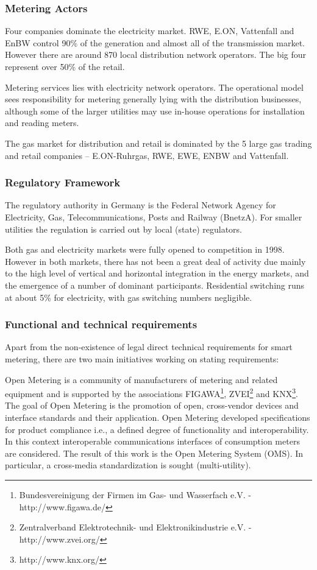 \subsubsection{Metering Actors}

Four companies dominate the electricity market. RWE, E.ON, Vattenfall and EnBW control 90\% of the generation and almost all of the transmission market. However there are around 870 local distribution network operators. The big four represent over 50\% of the retail.

Metering services lies with electricity network operators. The operational model sees 
responsibility for metering generally lying with the distribution businesses, although some of the larger utilities may use in-house operations for installation and reading meters.

The gas market for distribution and retail is dominated by the 5 large gas trading and retail companies – E.ON-Ruhrgas, RWE, EWE, ENBW and Vattenfall.

\subsubsection{Regulatory Framework}

The regulatory authority in Germany is  the  Federal  Network  Agency  for  Electricity,  Gas, Telecommunications, Posts and Railway (BnetzA). For smaller utilities the regulation is carried out by local (state) regulators.

Both gas and electricity markets were fully opened to competition in 1998. However in both markets, there has not been a great deal of activity due mainly to the high level of vertical and horizontal integration in the energy markets, and the emergence of a number of dominant participants. Residential switching runs at about 5\% for electricity, with gas switching numbers negligible.

\subsubsection{Functional and technical requirements}
Apart from the non-existence of legal direct technical requirements for smart metering, there are two main initiatives working on stating requirements:

Open Metering is a community of manufacturers of metering and related equipment and is supported by the associations FIGAWA\footnote{Bundesvereinigung der Firmen im Gas- und Wasserfach e.V. - http://www.figawa.de/}, ZVEI\footnote{Zentralverband Elektrotechnik- und Elektronikindustrie e.V. - http://www.zvei.org/} and KNX\footnote{http://www.knx.org/}. The goal of Open Metering is the promotion of open, cross-vendor devices and interface standards and their application. Open Metering developed specifications for product compliance i.e., a defined degree of functionality and interoperability. In this context interoperable communications interfaces of consumption meters are considered. The result of this work is the Open Metering System (OMS). In particular, a cross-media standardization is sought (multi-utility).

